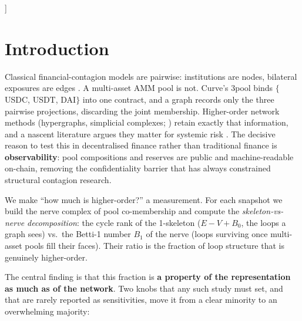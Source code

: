 \documentclass[10pt,twocolumn]{article}
\begin{document}
\begin{@twocolumnfalse}
\vspace{0.9em}

\vspace{0.5em}
\noindent{\small{\sffamily\bfseries JEL classification}\ \ C81 \textperiodcentered\ D85
\textperiodcentered\ C65 \textperiodcentered\ E42 \textperiodcentered\ G14
\textperiodcentered\ G23\par}
\vspace{1.8em}
\end{@twocolumnfalse}
]

\section{Introduction}

Classical financial-contagion models are pairwise: institutions are nodes, bilateral
exposures are edges \citep{eisenberg2001}. A multi-asset AMM pool is not. Curve's 3pool
binds $\{$USDC, USDT, DAI$\}$ into one contract, and a graph records only the three
pairwise projections, discarding the joint membership. Higher-order network methods
(hypergraphs, simplicial complexes; \citealp{bick2023}) retain exactly that information,
and a nascent literature argues they matter for systemic risk \citep{forte2026}. The
decisive reason to test this in decentralised finance rather than traditional finance is
\textbf{observability}: pool compositions and reserves are public and machine-readable
on-chain, removing the confidentiality barrier that has always constrained structural
contagion research.

We make ``how much is higher-order?'' a measurement. For each snapshot we build the nerve
complex of pool co-membership and compute the \emph{skeleton-vs-nerve decomposition}: the
cycle rank of the 1-skeleton ($E-V+B_0$, the loops a graph sees) vs.\ the Betti-1 number
$B_1$ of the nerve (loops surviving once multi-asset pools fill their faces). Their
ratio is the fraction of loop structure that is genuinely higher-order.

The central finding is that this fraction is \textbf{a property of the representation as
much as of the network}. Two knobs that any such study must set, and that are rarely
reported as sensitivities, move it from a clear minority to an overwhelming majority:
\end{document}
